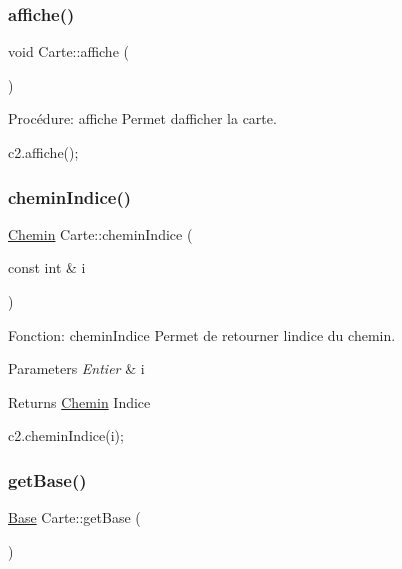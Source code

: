 \subsubsection{\texorpdfstring{affiche()}{affiche()}}
{\footnotesize\ttfamily void Carte\+::affiche (\begin{DoxyParamCaption}{ }\end{DoxyParamCaption})}



Procédure\+: affiche Permet d\textquotesingle{}afficher la carte. 


\begin{DoxyCode}
c2.affiche();
\end{DoxyCode}
 \mbox{\label{classCarte_aaab8126dc81caed5a8e38772d84b60e4}} 
\subsubsection{\texorpdfstring{chemin\+Indice()}{cheminIndice()}}
{\footnotesize\ttfamily \hyperlink{classChemin}{Chemin} Carte\+::chemin\+Indice (\begin{DoxyParamCaption}\item[{const int \&}]{i }\end{DoxyParamCaption})}



Fonction\+: chemin\+Indice Permet de retourner l\textquotesingle{}indice du chemin. 


\begin{DoxyParams}{Parameters}
{\em Entier} & i \\
\hline
\end{DoxyParams}
\begin{DoxyReturn}{Returns}
\hyperlink{classChemin}{Chemin} Indice 
\begin{DoxyCode}
c2.cheminIndice(i);
\end{DoxyCode}
 
\end{DoxyReturn}
\mbox{\label{classCarte_af76239ad9a307cf94ba0916ea477a331}} 
\subsubsection{\texorpdfstring{get\+Base()}{getBase()}}
{\footnotesize\ttfamily \hyperlink{classBase}{Base} Carte\+::get\+Base (\begin{DoxyParamCaption}{ }\end{DoxyParamCaption})}



